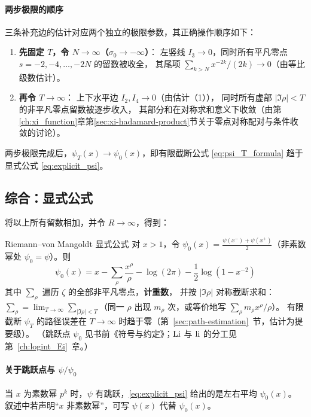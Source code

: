 \paragraph{两步极限的顺序}
三条补充边的估计对应两个独立的极限参数，其正确操作顺序如下：
\begin{enumerate}
  \item \textbf{先固定 $T$，令 $N\to\infty$（$\sigma_0\to-\infty$）}：
        左竖线 $I_3\to 0$，同时所有平凡零点 $s=-2,-4,\dots,-2N$ 的留数被收全，
        其尾项 $\sum_{k>N} x^{-2k}/(2k)\to 0$（由等比级数估计）。
  \item \textbf{再令 $T\to\infty$}：
        上下水平边 $I_2, I_4\to 0$（由估计（1）），
        同时所有虚部 $|\Im\rho|<T$ 的非平凡零点留数被逐步收入，
        其部分和在对称求和意义下收敛（由第\ref{ch:xi_function}章第\ref{sec:xi-hadamard-product}节关于零点对称配对与条件收敛的讨论）。
\end{enumerate}
两步极限完成后，$\psi_T(x)\to\psi_0(x)$，即有限截断公式 \eqref{eq:psi_T_formula} 趋于显式公式 \eqref{eq:explicit_psi}。


\subsection{综合：显式公式}

将以上所有留数相加，并令 $R\to\infty$，得到：

\begin{theorem}{Riemann--von Mangoldt 显式公式}{}
对 $x>1$，令 $\psi_0(x)=\frac{\psi(x^-)+\psi(x^+)}{2}$（非素数幂处 $\psi_0=\psi$）。则
\begin{equation}
\boxed{\psi_0(x)=x-\sum_{\rho}\frac{x^{\rho}}{\rho}-\log(2\pi)-\frac12\log(1-x^{-2})}
\label{eq:explicit_psi}
\end{equation}
其中 $\sum_{\rho}$ 遍历 $\zeta$ 的全部非平凡零点，\textbf{计重数}，
并按 $|\Im\rho|$ 对称截断求和：
$\sum_{\rho}=\lim_{T\to\infty}\sum_{|\Im\rho|<T}$（同一 $\rho$ 出现 $m_\rho$ 次，或等价地写 $\sum_\rho m_\rho x^\rho/\rho$）。
有限截断 $\psi_T$ 的路径误差在 $T\to\infty$ 时趋于零（第~\ref{sec:path-estimation}~节，估计为提要级）。
（跳跃点 $\psi_0$ 见书前《符号与约定》；$\operatorname{Li}$ 与 $\operatorname{li}$ 的分工见第~\ref{ch:logint_Ei}~章。）
\end{theorem}


\paragraph{关于跳跃点与 $\psi/\psi_0$}
当 $x$ 为素数幂 $p^k$ 时，$\psi$ 有跳跃，\eqref{eq:explicit_psi} 给出的是左右平均 $\psi_0(x)$。
叙述中若声明“$x$ 非素数幂”，可写 $\psi(x)$ 代替 $\psi_0(x)$。


